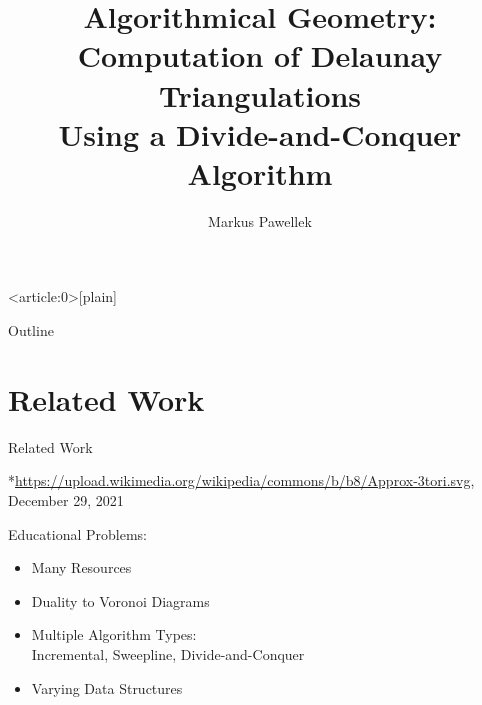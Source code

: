 \documentclass[aspectratio=169,fleqn]{beamer}
\title{%
  Algorithmical Geometry: \\ Computation of Delaunay Triangulations \\ Using a Divide-and-Conquer Algorithm%
}
\author{Markus Pawellek}
\begin{document}

{ %
  \begin{frame}<article:0>[plain]
  \end{frame}
}

\frame{\titlepage}
\begin{frame}{Outline}
  \footnotesize
  \hfill\parbox[t][7cm][l]{0.9\textwidth}{\tableofcontents}
\end{frame}

\section{Related Work}
  \begin{frame}{Related Work}
    \begin{minipage}[c]{0.49\textwidth}
      \begin{figure}
        \centering
        
      \end{figure}
      {%
        \fontsize{4}{5}\selectfont%
        *\url{https://upload.wikimedia.org/wikipedia/commons/b/b8/Approx-3tori.svg}, December 29, 2021%
      }
    \end{minipage}
    \hfill
    \begin{minipage}[c]{0.45\textwidth}
      \pause
      Educational Problems:
      \begin{itemize}
        \pause
        \item Many Resources
        \pause
        \item Duality to Voronoi Diagrams
        \pause
        \item%
          Multiple Algorithm Types: \\
          Incremental, Sweepline, Divide-and-Conquer
        \pause
        \item Varying Data Structures
      \end{itemize}
    \end{minipage}
  \end{frame}
\end{document}
